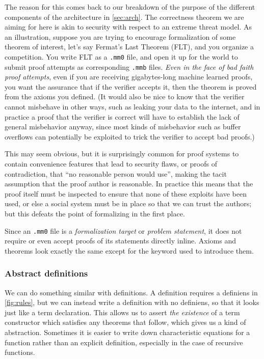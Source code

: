 \documentclass[runningheads]{llncs}
\begin{document}
The reason for this comes back to our breakdown of the purpose of the different components of the architecture in \autoref{sec:arch}. The correctness theorem we are aiming for here is akin to security with respect to an extreme threat model. As an illustration, suppose you are trying to encourage formalization of some theorem of interest, let's say Fermat's Last Theorem (FLT), and you organize a competition. You write FLT as a \texttt{.mm0} file, and open it up for the world to submit proof attempts as corresponding \texttt{.mmb} files. \emph{Even in the face of bad faith proof attempts}, even if you are receiving gigabytes-long machine learned proofs, you want the assurance that if the verifier accepts it, then the theorem is proved from the axioms you defined. (It would also be nice to know that the verifier cannot misbehave in other ways, such as leaking your data to the internet, and in practice a proof that the verifier is correct will have to establish the lack of general misbehavior anyway, since most kinds of misbehavior such as buffer overflows can potentially be exploited to trick the verifier to accept bad proofs.)

This may seem obvious, but it is surprisingly common for proof systems to contain convenience features that lead to security flaws, or proofs of contradiction, that ``no reasonable person would use'', making the tacit assumption that the proof author is reasonable. In practice this means that the proof itself must be inspected to ensure that none of these exploits have been used, or else a social system must be in place so that we can trust the authors; but this defeats the point of formalizing in the first place.

Since an \texttt{.mm0} file is a \emph{formalization target} or \emph{problem statement}, it does not require or even accept proofs of its statements directly inline. Axioms and theorems look exactly the same except for the keyword used to introduce them.

\subsubsection{Abstract definitions}
We can do something similar with definitions. A definition requires a definiens in \autoref{fig:rules}, but we can instead write a definition with no definiens, so that it looks just like a term declaration. This allows us to assert \emph{the existence} of a term constructor which satisfies any theorems that follow, which gives us a kind of abstraction. Sometimes it is easier to write down characteristic equations for a function rather than an explicit definition, especially in the case of recursive functions.
\end{document}
